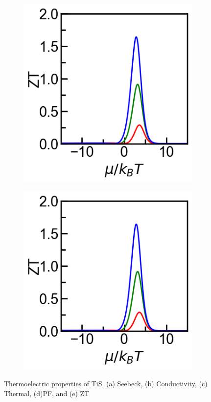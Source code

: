 \documentclass{article}
\begin{document}
\begin{figure}[ht]
\begin{subfigure}[b]{0.33\textwidth}
\end{subfigure}
\begin{subfigure}[b]{0.33\textwidth}
  \includegraphics[width=\textwidth]{../ZT.png}
\end{subfigure}
\begin{subfigure}[b]{0.33\textwidth}
    \includegraphics[width=\textwidth]{../ZT.png}
  \end{subfigure}

\caption{Thermoelectric properties of TiS. (a) Seebeck, (b) Conductivity, (c) Thermal, (d)PF, and (e) ZT}
\label{fig:six_images}
\end{figure}
\end{document}
